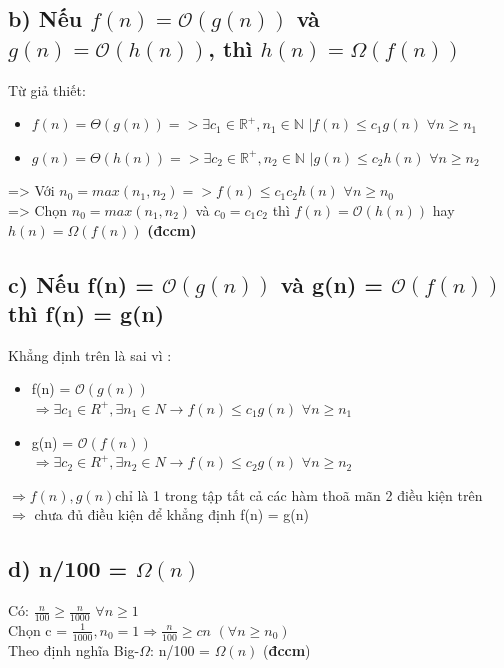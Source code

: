 \documentclass[10pt,a4paper]{article}
\begin{document}
\subsection*{b) Nếu $f(n) = \mathcal{O}(g(n))$ và $g(n) = \mathcal{O}(h(n))$, thì $h(n) = \Omega(f(n))$}
Từ giả thiết:
\begin{itemize}
    \item $f(n)=\Theta(g(n))$$=> \exists c_1 \in \mathbb{R^+}, n_1 \in \mathbb{N}$ $| f(n) \leq c_1g(n)$ $\forall n \geq n_1$
    \item $g(n)=\Theta(h(n))$$=> \exists c_2 \in \mathbb{R^+}, n_2 \in \mathbb{N}$ $| g(n) \leq c_2h(n)$ $\forall n \geq n_2$
\end{itemize}
=> Với $n_0 = max(n_1,n_2) => f(n) \leq c_1c_2h(n)$ $\forall n \geq n_0$ \\
=> Chọn $n_0 = max(n_1,n_2)$ và $c_0 = c_1c_2$ thì $f(n) = \mathcal{O}(h(n))$ hay $h(n) = \Omega(f(n))$ \textbf{(đccm)}
\subsection*{c) Nếu f(n) = $\mathcal{O}(g(n))$ và g(n) = $\mathcal{O}(f(n))$ thì f(n) = g(n)\\}
Khẳng định trên là sai vì :\\
\begin{itemize}
    \item  f(n) = $\mathcal{O}(g(n))$\\
    $\Rightarrow \exists c_1 \in R^+,\exists n_1 \in N \rightarrow f(n) \leq c_1g(n)$ $\forall n \geq n_1$
\end{itemize}
\begin{itemize}
    \item  g(n) = $\mathcal{O}(f(n))$\\
    $\Rightarrow \exists c_2 \in R^+,\exists n_2 \in N \rightarrow f(n) \leq c_2g(n)$ $\forall n \geq n_2$    
\end{itemize}
$\Rightarrow f(n), g(n) $chỉ là 1 trong tập tất cả các hàm thoã mãn 2 điều kiện trên\\
$\Rightarrow$ chưa đủ điều kiện để khẳng định f(n) = g(n)
\subsection*{d) n/100 = $\Omega(n)$}
Có: $\frac{n}{100} \geq \frac{n}{1000}$ $\forall n \geq 1$ \\
Chọn c = $\frac{1}{1000}, n_0 = 1 \Rightarrow \frac{n}{100} \geq cn$ $(\forall n \geq n_0)$\\
Theo định nghĩa Big-$\Omega$:  n/100 = $\Omega(n)$ (\textbf{đccm})\\
\end{document}
